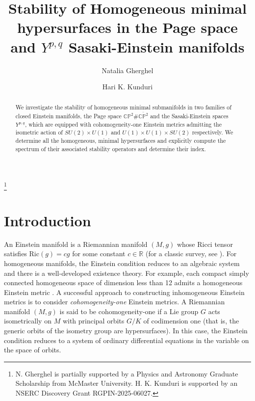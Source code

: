 \documentclass[11pt]{amsart}
\theoremstyle{plain}
\theoremstyle{definition}
\numberwithin{equation}{section}
\begin{document}
\title[Stability of Homogeneous minimal hypersurfaces...]{Stability of Homogeneous minimal hypersurfaces in the Page space and $Y^{p,q}$ Sasaki-Einstein manifolds}
\author{Natalia Gherghel}
\address{Department of Physics and Astronomy\\
		McMaster University\\
		Hamilton, ON Canada}
	\author{Hari K. Kunduri}
\address{Department of Mathematics and Statistics and Department of Physics and Astronomy\\
		McMaster University\\
		Hamilton, ON Canada}


\thanks{N. Gherghel is partially supported by a Physics and Astronomy Graduate Scholarship from McMaster University. H. K. Kunduri is supported by an  NSERC Discovery Grant RGPIN-2025-06027.}

\begin{abstract}
We investigate the stability of homogeneous minimal submanifolds in two families of closed Einstein manifolds, the Page space $\mathbb{CP}^2 \# \overline{\mathbb{CP}^2}$ and the Sasaki-Einstein spaces $Y^{p,q}$, which are equipped with cohomogeneity-one Einstein metrics admitting the isometric action of $SU(2) \times U(1)$ and $U(1) \times U(1) \times SU(2)$ respectively. We determine all the homogeneous, minimal hypersurfaces and explicitly compute the spectrum of their associated stability operators and determine their index. 
\end{abstract}
\maketitle
\section{Introduction}
An Einstein manifold is a Riemannian manifold $(M, g)$ whose Ricci tensor satisfies $\text{Ric}(g) = c g$ for some constant $c \in \mathbb{R}$ (for a classic survey, see \cite{Besse}). For homogeneous manifolds, the Einstein condition reduces to an algebraic system and there is a well-developed existence theory. For example, each compact simply
connected homogeneous space of dimension less than 12 admits a homogeneous Einstein metric \cite{Bohm2, Bohm}. A successful approach to constructing inhomogeneous Einstein metrics is to consider \emph{cohomogeneity-one} Einstein metrics. A Riemannian manifold $(M,g)$ is said to be cohomogeneity-one if a Lie group $G$ acts isometrically on $M$ with principal orbits $G /K$ of codimension one (that is, the generic orbits of the isometry group are hypersurfaces). In this case, the Einstein condition reduces to a system of ordinary differential equations in the variable on the space of orbits. 
\end{document}
